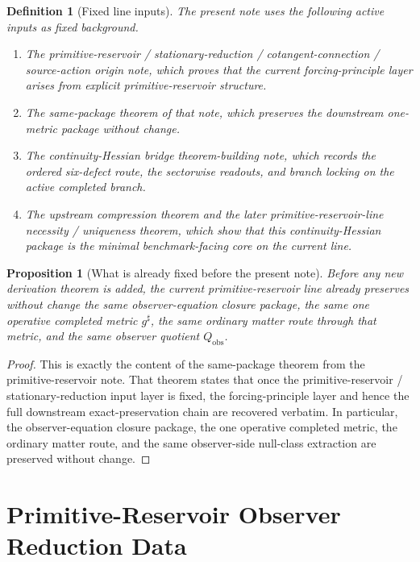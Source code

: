 \documentclass[11pt]{article}
\newcommand{\CompletedMetric}{g^{\sharp}}
\newcommand{\ObserverQuotient}{Q_{\mathrm{obs}}}
\newtheorem{definition}{Definition}
\newtheorem{proposition}{Proposition}
\begin{document}
\begin{definition}[Fixed line inputs]
\label{def:fixed}
The present note uses the following active inputs as fixed background.
\begin{enumerate}
    \item The primitive-reservoir / stationary-reduction / cotangent-connection / source-action origin note, which proves that the current forcing-principle layer arises from explicit primitive-reservoir structure.
    \item The same-package theorem of that note, which preserves the downstream one-metric package without change.
    \item The continuity-Hessian bridge theorem-building note, which records the ordered six-defect route, the sectorwise readouts, and branch locking on the active completed branch.
    \item The upstream compression theorem and the later primitive-reservoir-line necessity / uniqueness theorem, which show that this continuity-Hessian package is the minimal benchmark-facing core on the current line.
\end{enumerate}
\end{definition}

\begin{proposition}[What is already fixed before the present note]
\label{prop:already_fixed}
Before any new derivation theorem is added, the current primitive-reservoir line already preserves without change the same observer-equation closure package, the same one operative completed metric \(\CompletedMetric\), the same ordinary matter route through that metric, and the same observer quotient \(\ObserverQuotient\).
\end{proposition}

\begin{proof}
This is exactly the content of the same-package theorem from the primitive-reservoir note. That theorem states that once the primitive-reservoir / stationary-reduction input layer is fixed, the forcing-principle layer and hence the full downstream exact-preservation chain are recovered verbatim. In particular, the observer-equation closure package, the one operative completed metric, the ordinary matter route, and the same observer-side null-class extraction are preserved without change.
\end{proof}

\section{Primitive-Reservoir Observer Reduction Data}
\end{document}
